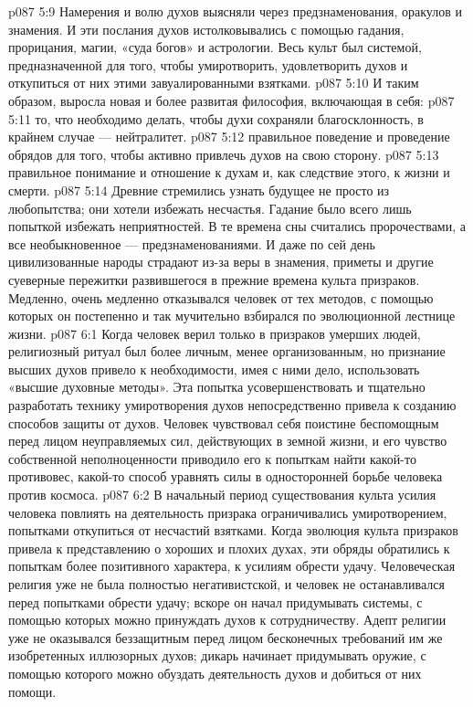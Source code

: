 \vs p087 5:9 Намерения и волю духов выясняли через предзнаменования, оракулов и знамения. И эти послания духов истолковывались с помощью гадания, прорицания, магии, «суда богов» и астрологии. Весь культ был системой, предназначенной для того, чтобы умиротворить, удовлетворить духов и откупиться от них этими завуалированными взятками.
\vs p087 5:10 И таким образом, выросла новая и более развитая философия, включающая в себя:
\vs p087 5:11 \bibnobreakspace {} то, что необходимо делать, чтобы духи сохраняли благосклонность, в крайнем случае --- нейтралитет.
\vs p087 5:12 \bibnobreakspace {} правильное поведение и проведение обрядов для того, чтобы активно привлечь духов на свою сторону.
\vs p087 5:13 \bibnobreakspace {} правильное понимание и отношение к духам и, как следствие этого, к жизни и смерти.
\vs p087 5:14 \pc Древние стремились узнать будущее не просто из любопытства; они хотели избежать несчастья. Гадание было всего лишь попыткой избежать неприятностей. В те времена сны считались пророчествами, а все необыкновенное --- предзнаменованиями. И даже по сей день цивилизованные народы страдают из\hyp{}за веры в знамения, приметы и другие суеверные пережитки развившегося в прежние времена культа призраков. Медленно, очень медленно отказывался человек от тех методов, с помощью которых он постепенно и так мучительно взбирался по эволюционной лестнице жизни.
\vs p087 6:1 Когда человек верил только в призраков умерших людей, религиозный ритуал был более личным, менее организованным, но признание высших духов привело к необходимости, имея с ними дело, использовать «высшие духовные методы». Эта попытка усовершенствовать и тщательно разработать технику умиротворения духов непосредственно привела к созданию способов защиты от духов. Человек чувствовал себя поистине беспомощным перед лицом неуправляемых сил, действующих в земной жизни, и его чувство собственной неполноценности приводило его к попыткам найти какой\hyp{}то противовес, какой\hyp{}то способ уравнять силы в односторонней борьбе человека против космоса.
\vs p087 6:2 В начальный период существования культа усилия человека повлиять на деятельность призрака ограничивались умиротворением, попытками откупиться от несчастий взятками. Когда эволюция культа призраков привела к представлению о хороших и плохих духах, эти обряды обратились к попыткам более позитивного характера, к усилиям обрести удачу. Человеческая религия уже не была полностью негативистской, и человек не останавливался перед попытками обрести удачу; вскоре он начал придумывать системы, с помощью которых можно принуждать духов к сотрудничеству. Адепт религии уже не оказывался беззащитным перед лицом бесконечных требований им же изобретенных иллюзорных духов; дикарь начинает придумывать оружие, с помощью которого можно обуздать деятельность духов и добиться от них помощи.
